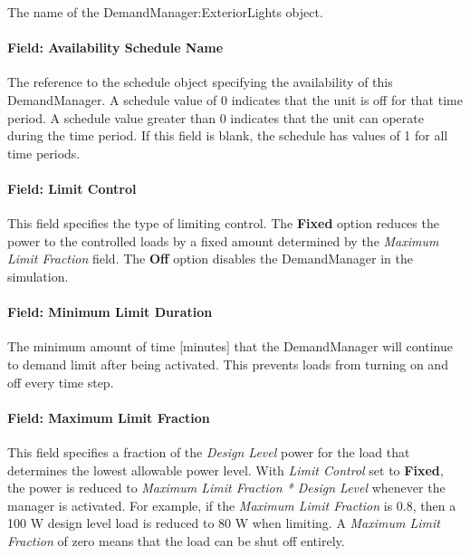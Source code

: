 The name of the DemandManager:ExteriorLights object.

\paragraph{Field: Availability Schedule Name}\label{field-availability-schedule-name-003}

The reference to the schedule object specifying the availability of this DemandManager. A schedule value of 0 indicates that the unit is off for that time period. A schedule value greater than 0 indicates that the unit can operate during the time period. If this field is blank, the schedule has values of 1 for all time periods.

\paragraph{Field: Limit Control}\label{field-limit-control}

This field specifies the type of limiting control. The \textbf{Fixed} option reduces the power to the controlled loads by a fixed amount determined by the \emph{Maximum Limit Fraction} field. The \textbf{Off} option disables the DemandManager in the simulation.

\paragraph{Field: Minimum Limit Duration}\label{field-minimum-limit-duration}

The minimum amount of time {[}minutes{]} that the DemandManager will continue to demand limit after being activated. This prevents loads from turning on and off every time step.

\paragraph{Field: Maximum Limit Fraction}\label{field-maximum-limit-fraction}

This field specifies a fraction of the \emph{Design Level} power for the load that determines the lowest allowable power level. With \emph{Limit Control} set to \textbf{Fixed}, the power is reduced to \emph{Maximum Limit Fraction * Design Level} whenever the manager is activated. For example, if the \emph{Maximum Limit Fraction} is 0.8, then a 100 W design level load is reduced to 80 W when limiting. A \emph{Maximum Limit Fraction} of zero means that the load can be shut off entirely.

